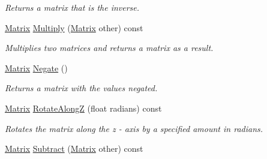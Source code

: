\begin{DoxyCompactItemize}
\begin{DoxyCompactList}\small\item\em Returns a matrix that is the inverse. \end{DoxyCompactList}\item 
\hypertarget{struct_jade_1_1_math_1_1_matrix_a449adacaa4ef60d602e95f73d0d12c8a}{}\hyperlink{struct_jade_1_1_math_1_1_matrix}{Matrix} \hyperlink{struct_jade_1_1_math_1_1_matrix_a449adacaa4ef60d602e95f73d0d12c8a}{Multiply} (\hyperlink{struct_jade_1_1_math_1_1_matrix}{Matrix} other) const \label{struct_jade_1_1_math_1_1_matrix_a449adacaa4ef60d602e95f73d0d12c8a}

\begin{DoxyCompactList}\small\item\em Multiplies two matrices and returns a matrix as a result. \end{DoxyCompactList}\item 
\hypertarget{struct_jade_1_1_math_1_1_matrix_a606d14bf38bf0b407b6c5c9a3faa6d83}{}\hyperlink{struct_jade_1_1_math_1_1_matrix}{Matrix} \hyperlink{struct_jade_1_1_math_1_1_matrix_a606d14bf38bf0b407b6c5c9a3faa6d83}{Negate} ()\label{struct_jade_1_1_math_1_1_matrix_a606d14bf38bf0b407b6c5c9a3faa6d83}

\begin{DoxyCompactList}\small\item\em Returns a matrix with the values negated. \end{DoxyCompactList}\item 
\hypertarget{struct_jade_1_1_math_1_1_matrix_a4e611999b9d39fb3027f2c9007a1f930}{}\hyperlink{struct_jade_1_1_math_1_1_matrix}{Matrix} \hyperlink{struct_jade_1_1_math_1_1_matrix_a4e611999b9d39fb3027f2c9007a1f930}{Rotate\+Along\+Z} (float radians) const \label{struct_jade_1_1_math_1_1_matrix_a4e611999b9d39fb3027f2c9007a1f930}

\begin{DoxyCompactList}\small\item\em Rotates the matrix along the z -\/ axis by a specified amount in radians. \end{DoxyCompactList}\item 
\hypertarget{struct_jade_1_1_math_1_1_matrix_af5c307e7450771500c0b1199f7f04096}{}\hyperlink{struct_jade_1_1_math_1_1_matrix}{Matrix} \hyperlink{struct_jade_1_1_math_1_1_matrix_af5c307e7450771500c0b1199f7f04096}{Subtract} (\hyperlink{struct_jade_1_1_math_1_1_matrix}{Matrix} other) const \label{struct_jade_1_1_math_1_1_matrix_af5c307e7450771500c0b1199f7f04096}


\end{DoxyCompactItemize}
